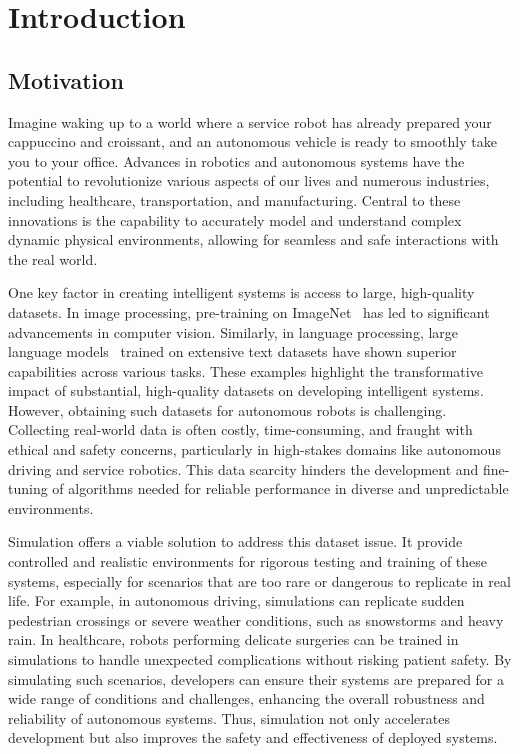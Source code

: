 \chapter{Introduction}

\section{Motivation}

Imagine waking up to a world where a service robot has already prepared your cappuccino and croissant, and an autonomous vehicle is ready to smoothly take you to your office. Advances in robotics and autonomous systems have the potential to revolutionize various aspects of our lives and numerous industries, including healthcare, transportation, and manufacturing. Central to these innovations is the capability to accurately model and understand complex dynamic physical environments, allowing for seamless and safe interactions with the real world.

One key factor in creating intelligent systems is access to large, high-quality datasets. In image processing, pre-training on ImageNet~\cite{deng2009imagenet} has led to significant advancements in computer vision. Similarly, in language processing, large language models~\cite{radford2018improving} trained on extensive text datasets have shown superior capabilities across various tasks. These examples highlight the transformative impact of substantial, high-quality datasets on developing intelligent systems. However, obtaining such datasets for autonomous robots is challenging. Collecting real-world data is often costly, time-consuming, and fraught with ethical and safety concerns, particularly in high-stakes domains like autonomous driving and service robotics. This data scarcity hinders the development and fine-tuning of algorithms needed for reliable performance in diverse and unpredictable environments.

Simulation offers a viable solution to address this dataset issue. It provide controlled and realistic environments for rigorous testing and training of these systems, especially for scenarios that are too rare or dangerous to replicate in real life. For example, in autonomous driving, simulations can replicate sudden pedestrian crossings or severe weather conditions, such as snowstorms and heavy rain. In healthcare, robots performing delicate surgeries can be trained in simulations to handle unexpected complications without risking patient safety. By simulating such scenarios, developers can ensure their systems are prepared for a wide range of conditions and challenges, enhancing the overall robustness and reliability of autonomous systems. Thus, simulation not only accelerates development but also improves the safety and effectiveness of deployed systems.

